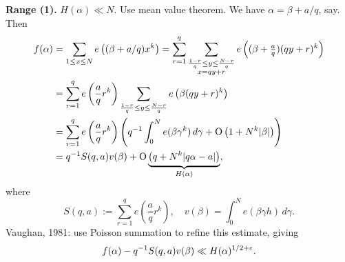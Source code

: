 \documentclass[reqno]{amsart} 
\numberwithin{theorem}{section}
\numberwithin{equation}{section}
\begin{document}
\textbf{Range (1).}
$H(\alpha) \ll N$.  Use mean value theorem.  We have $\alpha = \beta + a/q$, say.  Then
\begin{align*}
  f(\alpha)
  &= \sum_{1 \leq x \leq N} e \left((\beta + a/q) x^k \right)
                                                                                                    =
                                                                                                    \sum_{r = 1}^q \sum_{
                                                                                                    \substack{
                                                                                                    \frac{1 - r}{q} \leq y \leq \frac{N - r}{q}  \\
  x = q y + r
  }
  }
  e \left((\beta + \tfrac{a}{q})(q y + r)^k \right) \\
                                                                                                 &=
                                                                                                    \sum_{r = 1}^q e \left( \frac{a}{q} r^k \right)
                                                                                                    \sum_{\frac{1 - r}{q} \leq y \leq \frac{N - r}{q}}
                                                                                                    e \left( \beta(q y + r)^k \right) \\
                                                                                                 &=
                                                                                                    \sum_{r = 1}^q e  \left( \frac{a}{q} r^k \right) \left( q^{-1} \int_0^N e(\beta \gamma^k) \, d \gamma
                                                                                                    + \operatorname{O}\left(1 + N^k \lvert \beta \rvert\right)\right) \\
                                                                                                 &=q^{-1} S(q, a) v(\beta) + \operatorname{O} \underbrace
                                                                                                    {
                                                                                                    \left( q + N^k \lvert q \alpha - a \rvert  \right)
                                                                                                    }_{
                                                                                                    H(\alpha)
                                                                                                    },
\end{align*}
where
\begin{equation*}
  S(q, a) := \sum_{r = 1}^q e \left( \frac{a}{q} r^k \right),
  \quad
  v(\beta) = \int_0^N e(\beta \gamma h) \, d \gamma.
\end{equation*}
Vaughan, 1981: use Poisson summation to refine this estimate, giving
\begin{equation*}
  f(\alpha) - q^{-1} S(q, a) v(\beta) \ll H(\alpha)^{1/2 + \varepsilon}.
\end{equation*}
\end{document}
